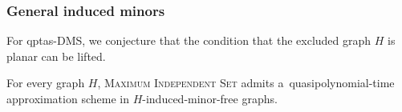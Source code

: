 \documentclass[a4paper,11pt]{article}
\newcommand{\mis}{\textsc{Maximum Independent Set}\xspace}
\newtheorem{solved-conj}[conj]{Conjecture}
\newenvironment{solved-conjecture}[1][]
{
  \if\relax\detokenize{#1}\relax\begin{solved-conj}\else\begin{solved-conj}[#1]\fi
  \begin{mdframed}[style=solvedconjecturestyle]
}
{
  \end{mdframed}\end{solved-conj}
}
\begin{document}

\subsubsection{General induced minors}\label{subsec:ind-min}

For qptas-DMS, we conjecture that the condition that the excluded graph $H$ is planar can be lifted.

\begin{solved-conjecture}\label{conj:qptas-h-ind-min-f}
For every graph $H$, \mis admits a~quasipolyno\-mial-time approximation scheme in $H$-induced-minor-free graphs.
\end{solved-conjecture}
\end{document}
